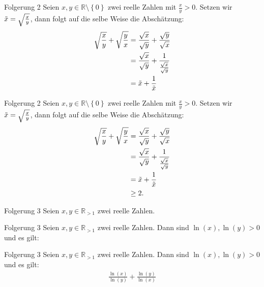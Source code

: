 \documentclass[10pt]{beamer}
\def\bR{\mathbb{R}}
\begin{document}
\begin{frame}{Folgerung 2}
    Seien \( x, y \in \bR \setminus \left\{ 0 \right\} \) zwei reelle Zahlen mit \( \frac{x}{y} > 0 \). Setzen wir \( \Tilde{x} = \sqrt{\frac{x}{y}} \), dann folgt auf die selbe Weise die Abschätzung:
    \begin{align*}
        \sqrt{\frac{x}{y}} + \sqrt{\frac{y}{x}} 
        & = \frac{\sqrt{x}}{\sqrt{y}} + \frac{\sqrt{y}}{\sqrt{x}} \\
        & = \frac{\sqrt{x}}{\sqrt{y}} + \frac{1}{\frac{\sqrt{x}}{\sqrt{y}}} \\
        & = \Tilde{x} + \frac{1}{\Tilde{x}}
    \end{align*}
\end{frame}



\begin{frame}{Folgerung 2}
    Seien \( x, y \in \bR \setminus \left\{ 0 \right\} \) zwei reelle Zahlen mit \( \frac{x}{y} > 0 \). Setzen wir \( \Tilde{x} = \sqrt{\frac{x}{y}} \), dann folgt auf die selbe Weise die Abschätzung:
    \begin{align*}
        \sqrt{\frac{x}{y}} + \sqrt{\frac{y}{x}} 
        & = \frac{\sqrt{x}}{\sqrt{y}} + \frac{\sqrt{y}}{\sqrt{x}} \\
        & = \frac{\sqrt{x}}{\sqrt{y}} + \frac{1}{\frac{\sqrt{x}}{\sqrt{y}}} \\
        & = \Tilde{x} + \frac{1}{\Tilde{x}} \\
        & \geq 2.
    \end{align*}
\end{frame}



\begin{frame}{Folgerung 3}
    Seien \( x, y \in \bR_{> 1} \) zwei reelle Zahlen.
\end{frame}



\begin{frame}{Folgerung 3}
    Seien \( x, y \in \bR_{> 1} \) zwei reelle Zahlen. Dann sind \( \ln\left( x \right), \ln\left( y \right) > 0 \) und es gilt:
\end{frame}



\begin{frame}{Folgerung 3}
    Seien \( x, y \in \bR_{> 1} \) zwei reelle Zahlen. Dann sind \( \ln\left( x \right), \ln\left( y \right) > 0 \) und es gilt:
    \begin{align*}
        \frac{\ln\left( x \right)}{\ln\left( y \right)} + \frac{\ln\left( y \right)}{\ln\left( x \right)} 
    \end{align*}
\end{frame}
\end{document}

